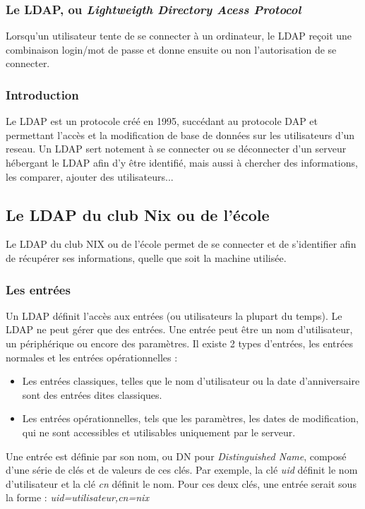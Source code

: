 \subsubsection{Le LDAP, ou \textit{Lightweigth Directory Acess Protocol}}

Lorsqu'un utilisateur tente de se connecter à un ordinateur, le LDAP reçoit une combinaison login/mot de passe et donne
ensuite ou non l'autorisation de se connecter.


\subsubsection{Introduction}

Le LDAP est un protocole créé en 1995, succédant au protocole DAP et permettant l'accès et la modification de base de données
 sur les utilisateurs d'un reseau. Un LDAP sert notement à se connecter ou se déconnecter d'un serveur hébergant le LDAP afin
  d'y être identifié, mais aussi à chercher des informations, les comparer, ajouter des utilisateurs...
\subsection{Le LDAP du club Nix ou de l'école}
Le LDAP du club NIX ou de l'école permet de se connecter et de s'identifier afin de récupérer ses informations, quelle que soit
 la machine utilisée.


\subsubsection{Les entrées}

Un LDAP définit l'accès aux entrées (ou utilisateurs la plupart du temps).
Le LDAP ne peut gérer que des entrées. Une entrée peut être un nom d'utilisateur, un périphérique ou encore des paramètres.
 Il existe 2 types d'entrées, les entrées normales et les entrées opérationnelles :
\begin{itemize}
    \item Les entrées classiques, telles que le nom d'utilisateur ou la date d'anniversaire sont des entrées dites classiques.
    \item Les entrées opérationnelles, tels que les paramètres, les dates de modification, qui ne sont accessibles et utilisables
    uniquement par le serveur.
\end{itemize}
Une entrée est définie par son nom, ou DN pour \textit{Distinguished Name}, composé d'une série de clés et de valeurs de ces clés.
Par exemple, la clé \textit{uid} définit le nom d'utilisateur et la clé \textit{cn} définit le nom. Pour ces deux clés,
 une entrée serait sous la forme : \textit{uid=utilisateur,cn=nix}


